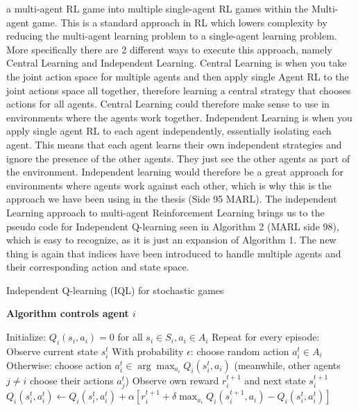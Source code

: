 \documentclass{article}
\begin{document}
a multi-agent RL game into multiple single-agent RL games within the Multi-agent game. This is a standard approach in RL which lowers complexity by reducing the multi-agent learning problem to a single-agent learning problem. More specifically there are 2 different ways to execute this approach, namely Central Learning and Independent Learning. Central Learning is when you take the joint action space for multiple agents and then apply single Agent RL to the joint actions space all together, therefore learning a central strategy that chooses actions for all agents. Central Learning could therefore make sense to use in environments where the agents work together. Independent Learning is when you apply single agent RL to each agent independently, essentially isolating each agent. This means that each agent learns their own independent strategies and ignore the presence of the other agents. They just see the other agents as part of the environment. Independent learning would therefore be a great approach for environments where agents work against each other, which is why this is the approach we have been using in the thesis (Side 95 MARL). 
\newline
\newline
The independent Learning approach to multi-agent Reinforcement Learning brings us to the pseudo code for Independent Q-learning seen in Algorithm 2 (MARL side 98), which is easy to recognize, as it is just an expansion of Algorithm 1. The new thing is again that indices have been introduced to handle multiple agents and their corresponding action and state space.
\begin{algorithm}[H]
\caption{Independent Q-learning (IQL) for stochastic games}
\textbf{Algorithm controls agent \(i\)}
\begin{algorithmic}[1]
\State Initialize: \( Q_i(s_i, a_i) = 0 \) for all \( s_i \in S_i, a_i \in A_i \)
\State Repeat for every episode:
    \State Observe current state \( s_i^t \)
    \State With probability \( \epsilon \): choose random action \( a_i^t \in A_i \)
    \State Otherwise: choose action \( a_i^t \in \arg \max_{a_i} Q_i(s_i^t, a_i) \)
    \State (meanwhile, other agents \( j \neq i \) choose their actions \( a_j^t \))
    \State Observe own reward \( r_i^{t+1} \) and next state \( s_i^{t+1} \)
    \State \( Q_i(s_i^t, a_i^t) \gets Q_i(s_i^t, a_i^t) + \alpha [r_i^{t+1} + \delta \max_{a_i} Q_i(s_i^{t+1}, a_i) - Q_i(s_i^t, a_i^t)] \)
\EndFor
\end{algorithmic}
\end{algorithm}
\end{document}
